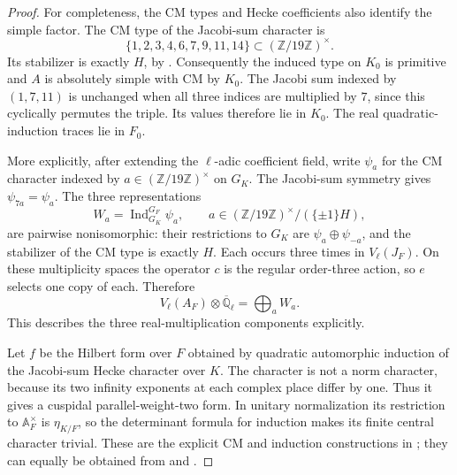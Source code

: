 \begin{proof}
For completeness, the CM types and Hecke coefficients also
identify the simple factor.  The CM type of the Jacobi-sum
character is
\[
 \{1,2,3,4,6,7,9,11,14\}\subset(\mathbb Z/19\mathbb Z)^\times.
\]
Its stabilizer is exactly $H$, by \citet[Lemma~1.6, pp.~206--207]{GrossRohrlich1978}.  Consequently the induced type on
$K_0$ is primitive and $A$ is absolutely simple with CM by
$K_0$.  The Jacobi sum indexed by $(1,7,11)$ is unchanged
when all three indices are multiplied by $7$, since this
cyclically permutes the triple.  Its values therefore lie in
$K_0$.  The real quadratic-induction traces lie in $F_0$.

More explicitly, after extending the $\ell$-adic coefficient field,
write $\psi_a$ for the CM character indexed by
$a\in(\mathbb Z/19\mathbb Z)^\times$ on $G_K$.
The Jacobi-sum symmetry gives $\psi_{7a}=\psi_a$.
The three representations
\[
 W_a=\operatorname{Ind}_{G_K}^{G_F}\psi_a,
 \qquad a\in(\mathbb Z/19\mathbb Z)^\times/(\{\pm1\}H),
\]
are pairwise nonisomorphic: their restrictions to $G_K$ are
$\psi_a\oplus\psi_{-a}$, and the stabilizer of the CM type
is exactly $H$.  Each occurs three times in $V_\ell(J_F)$.
On these multiplicity spaces the operator $c$ is the regular
order-three action, so $e$ selects one copy of each.  Therefore
\[
 V_\ell(A_F)\otimes\overline{\mathbb Q}_\ell
       =\bigoplus_a W_a.
\]
This describes the three real-multiplication components explicitly.

Let $f$ be the Hilbert form over $F$ obtained by quadratic
automorphic induction of the Jacobi-sum Hecke character over
$K$.  The character is not a norm character, because its
two infinity exponents at each complex place differ by one.
Thus it gives a cuspidal parallel-weight-two form.  In unitary
normalization its restriction to $\mathbb A_F^\times$ is
$\eta_{K/F}$, so the determinant formula for induction makes
its finite central character trivial.  These are the explicit
CM and induction constructions in \citet[\S\S2.1--2.2 and 3.4, author pp.~5--6 and 15]{ShuExpanded2021}; they can equally be obtained
from \citet[Theorems~10--11]{SerreTate1968} and
\citet[Proposition~12.1]{JacquetLanglands1970}.


\end{proof}
